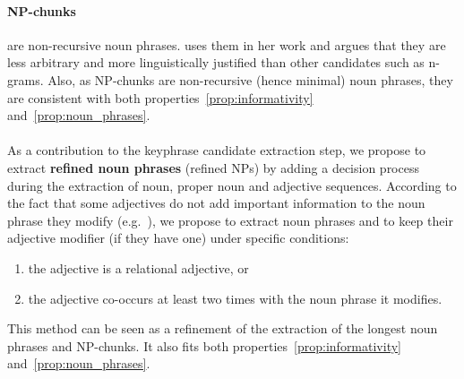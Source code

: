   \paragraph{NP-chunks} are non-recursive noun phrases.
   uses them in her work and argues that
  they are less arbitrary and more linguistically justified than other
  candidates such as n-grams. Also, as NP-chunks are non-recursive (hence
  minimal) noun phrases, they are consistent with both
  properties~\ref{prop:informativity} and~\ref{prop:noun_phrases}.


  \paragraph{}
  As a contribution to the keyphrase candidate extraction step, we propose to
  extract \textbf{refined noun phrases} (refined NPs) by adding a decision
  process during the extraction of noun, proper noun and adjective sequences.
  According to the fact that some adjectives do not add important information to
  the noun phrase they modify (e.g.~), we propose to extract noun
  phrases and to keep their adjective modifier (if they have one) under specific
  conditions:
  \begin{enumerate}
    \item{the adjective is a relational adjective, or}
    \item{the adjective co-occurs at least two times with the noun phrase it
          modifies.}
  \end{enumerate}
  This method can be seen as a refinement of the extraction of the longest noun
  phrases and NP-chunks. It also fits both properties~\ref{prop:informativity}
  and~\ref{prop:noun_phrases}.

